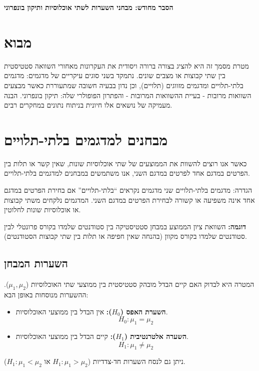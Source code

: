 \documentclass[12pt]{article}
\makeatletter
\newcommand{\enquote}[1]{\textquotedblleft #1\textquotedblright}
\renewcommand\tableofcontents{%
  \section*{\contentsname}%
  \addcontentsline{toc}{section}{\contentsname}%
  \@starttoc{toc}%
}
\makeatother
\begin{document}
\begin{center}
    \fontsize{20}{24}\selectfont
    \textbf{הסבר מחודש: מבחני השערות לשתי אוכלוסיות ותיקון בונפרוני}
\end{center}

\vspace{1cm} %

\tableofcontents
\clearpage %


\section*{מבוא}
מטרת מסמך זה היא להציג בצורה ברורה ויסודית את העקרונות מאחורי השוואה סטטיסטית בין שתי קבוצות או מצבים שונים. נתמקד בשני סוגים עיקריים של מדגמים: מדגמים בלתי-תלויים ומדגמים מזווגים (תלויים), וכן נדון בבעיה חשובה שמתעוררת כאשר מבצעים השוואות מרובות - בעיית ההשוואות המרובות - והפתרון הפופולרי שלה: תיקון בונפרוני. הבנה מעמיקה של נושאים אלו חיונית בניתוח נתונים במחקרים רבים.

\section{מבחנים למדגמים בלתי-תלויים}
כאשר אנו רוצים להשוות את הממוצעים של שתי אוכלוסיות שונות, שאין קשר או תלות בין הפרטים במדגם אחד לפרטים במדגם השני, אנו משתמשים במבחנים למדגמים בלתי-תלויים.

\begin{definitionBox}{הגדרה: מדגמים בלתי-תלויים}
שני מדגמים נקראים \enquote{בלתי-תלויים} אם בחירת הפרטים במדגם אחד אינה משפיעה או קשורה לבחירת הפרטים במדגם השני. המדגמים נלקחים משתי קבוצות או אוכלוסיות שונות לחלוטין.

\vspace{0.5\baselineskip} %
\textbf{דוגמה:} השוואת ציון הממוצע במבחן סטטיסטיקה בין סטודנטים שלמדו בקורס פרונטלי לבין סטודנטים שלמדו בקורס מקוון (בהנחה שאין חפיפה או תלות בין שתי קבוצות הסטודנטים).
\end{definitionBox}

\subsection*{השערות המבחן}
המטרה היא לבדוק האם קיים הבדל מובהק סטטיסטית בין ממוצעי שתי האוכלוסיות (\(\mu_1, \mu_2\)). ההשערות מנוסחות באופן הבא:
\begin{itemize}
    \item \textbf{השערת האפס (\(H_0\)):} אין הבדל בין ממוצעי האוכלוסיות.
    \[ H_0: \mu_1 = \mu_2 \]
    \item \textbf{השערה אלטרנטיבית (\(H_1\)):} קיים הבדל בין ממוצעי האוכלוסיות.
    \[ H_1: \mu_1 \neq \mu_2 \]
\end{itemize}
ניתן גם לנסח השערות חד-צדדיות (\(H_1: \mu_1 > \mu_2\) או \(H_1: \mu_1 < \mu_2\)).
\end{document}
